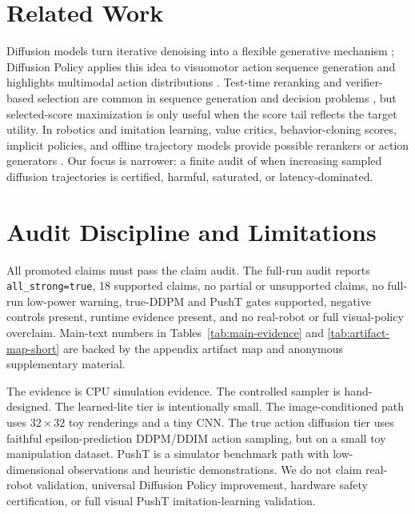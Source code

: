 \documentclass{article}
\begin{document}
\section{Related Work}

Diffusion models turn iterative denoising into a flexible generative mechanism \citep{sohl2015deep,ho2020ddpm,song2020ddim}; Diffusion Policy applies this idea to visuomotor action sequence generation and highlights multimodal action distributions \citep{chi2023diffusionpolicy}. Test-time reranking and verifier-based selection are common in sequence generation and decision problems \citep{cobbe2021training,yao2023tree}, but selected-score maximization is only useful when the score tail reflects the target utility. In robotics and imitation learning, value critics, behavior-cloning scores, implicit policies, and offline trajectory models provide possible rerankers or action generators \citep{florence2022implicit,janner2022diffuser,mandlekar2021robomimic}. Our focus is narrower: a finite audit of when increasing sampled diffusion trajectories is certified, harmful, saturated, or latency-dominated.

\section{Audit Discipline and Limitations}

All promoted claims must pass the claim audit. The full-run audit reports \texttt{all\_strong=true}, 18 supported claims, no partial or unsupported claims, no full-run low-power warning, true-DDPM and PushT gates supported, negative controls present, runtime evidence present, and no real-robot or full visual-policy overclaim. Main-text numbers in Tables~\ref{tab:main-evidence} and \ref{tab:artifact-map-short} are backed by the appendix artifact map and anonymous supplementary material.

The evidence is CPU simulation evidence. The controlled sampler is hand-designed. The learned-lite tier is intentionally small. The image-conditioned path uses $32{\times}32$ toy renderings and a tiny CNN. The true action diffusion tier uses faithful epsilon-prediction DDPM/DDIM action sampling, but on a small toy manipulation dataset. PushT is a simulator benchmark path with low-dimensional observations and heuristic demonstrations. We do not claim real-robot validation, universal Diffusion Policy improvement, hardware safety certification, or full visual PushT imitation-learning validation.
\end{document}

